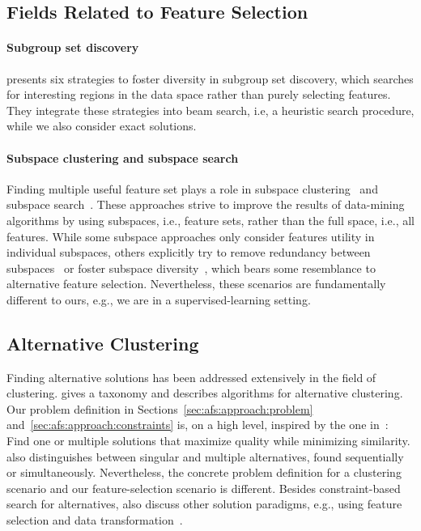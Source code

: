 \documentclass{article}
\theoremstyle{definition}
\begin{document}
\subsection{Fields Related to Feature Selection}

\paragraph{Subgroup set discovery}

\cite{leeuwen2012diverse} presents six strategies to foster diversity in subgroup set discovery, which searches for interesting regions in the data space rather than purely selecting features.
They integrate these strategies into beam search, i.e, a heuristic search procedure, while we also consider exact solutions.

\paragraph{Subspace clustering and subspace search}

Finding multiple useful feature set plays a role in subspace clustering~\cite{guan2011unified, hu2018subspace, mueller2009relevant} and subspace search~\cite{fouche2021efficient, nguyen20134s, trittenbach2019dimension}.
These approaches strive to improve the results of data-mining algorithms by using subspaces, i.e., feature sets, rather than the full space, i.e., all features.
While some subspace approaches only consider features utility in individual subspaces, others explicitly try to remove redundancy between subspaces~\cite{mueller2009relevant, nguyen20134s} or foster subspace diversity~\cite{fouche2021efficient, trittenbach2019dimension}, which bears some resemblance to alternative feature selection.
Nevertheless, these scenarios are fundamentally different to ours, e.g., we are in a supervised-learning setting.

\subsection{Alternative Clustering}

Finding alternative solutions has been addressed extensively in the field of clustering.
\cite{bailey2014alternative} gives a taxonomy and describes algorithms for alternative clustering.
Our problem definition in Sections~\ref{sec:afs:approach:problem} and~\ref{sec:afs:approach:constraints} is, on a high level, inspired by the one in~\cite{bailey2014alternative}:
Find one or multiple solutions that maximize quality while minimizing similarity.
\cite{bailey2014alternative} also distinguishes between singular and multiple alternatives, found sequentially or simultaneously.
Nevertheless, the concrete problem definition for a clustering scenario and our feature-selection scenario is different.
Besides constraint-based search for alternatives, \cite{bailey2014alternative} also discuss other solution paradigms, e.g., using feature selection and data transformation~\cite{tao2012novel}.
\end{document}
